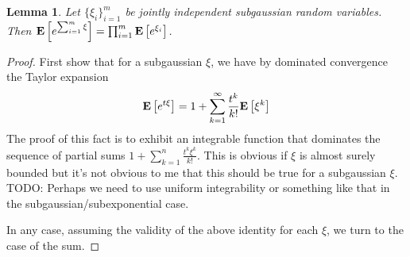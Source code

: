 \documentclass{amsart}
\newtheorem{lem}[thm]{Lemma}
\theoremstyle{remark}
\theoremstyle{definition}
\begin{document}
\begin{lem}Let $\{\xi_i\}_{i=1}^m$ be jointly independent subgaussian random variables.  Then $\textbf{E}\left[e^{\sum_{i=1}^m \xi}\right] =
  \prod_{i=1}^m \textbf{E}\left[e^{\xi_i}\right]$.
\end{lem}
\begin{proof}
First show that for a subgaussian $\xi$, we have by dominated
convergence the Taylor expansion 
$$\textbf{E}\left[e^{t\xi}\right] = 1 + \sum_{k=1}^\infty
\frac{t^k}{k!}\textbf{E}\left[\xi^k\right]$$
The proof of this fact is to exhibit an integrable function that
dominates the sequence of partial sums $1+\sum_{k=1}^n
\frac{t^k\xi^k}{k!}$.  This is obvious if $\xi$ is almost surely
bounded but it's not obvious to me that this should be true for a
subgaussian $\xi$.  TODO: Perhaps we need to use uniform integrability or
something like that in the subgaussian/subexponential case.

In any case, assuming the validity of the above identity for each
$\xi$, we turn to the case of the sum.
\end{proof}
\end{document}
